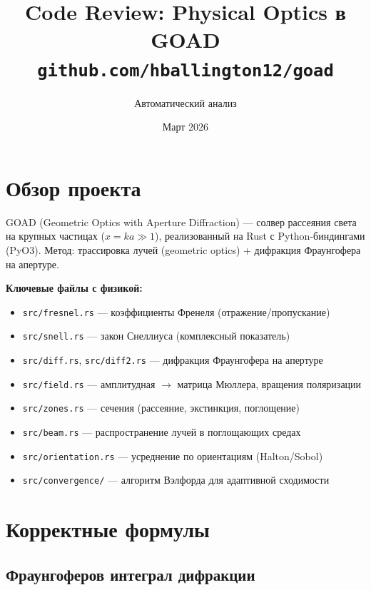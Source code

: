 \documentclass[12pt,a4paper]{article}
\title{Code Review: Physical Optics в GOAD\\[0.3em]
\large\texttt{github.com/hballington12/goad}}
\author{Автоматический анализ}
\date{Март 2026}
\begin{document}
\maketitle
\tableofcontents
\newpage

\section{Обзор проекта}

GOAD (Geometric Optics with Aperture Diffraction) --- солвер рассеяния света
на крупных частицах ($x = ka \gg 1$), реализованный на Rust с Python-биндингами (PyO3).
Метод: трассировка лучей (geometric optics) + дифракция Фраунгофера на апертуре.

\textbf{Ключевые файлы с физикой:}
\begin{itemize}[nosep]
  \item \texttt{src/fresnel.rs} --- коэффициенты Френеля (отражение/пропускание)
  \item \texttt{src/snell.rs} --- закон Снеллиуса (комплексный показатель)
  \item \texttt{src/diff.rs}, \texttt{src/diff2.rs} --- дифракция Фраунгофера на апертуре
  \item \texttt{src/field.rs} --- амплитудная $\to$ матрица Мюллера, вращения поляризации
  \item \texttt{src/zones.rs} --- сечения (рассеяние, экстинкция, поглощение)
  \item \texttt{src/beam.rs} --- распространение лучей в поглощающих средах
  \item \texttt{src/orientation.rs} --- усреднение по ориентациям (Halton/Sobol)
  \item \texttt{src/convergence/} --- алгоритм Вэлфорда для адаптивной сходимости
\end{itemize}


\section{Корректные формулы}

\subsection{Фраунгоферов интеграл дифракции}
\end{document}
